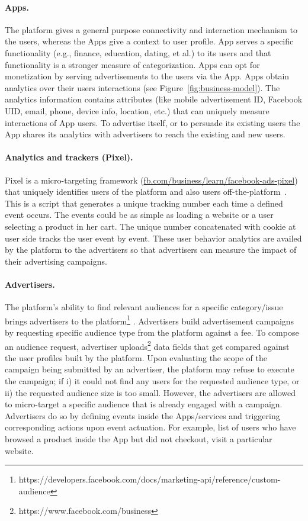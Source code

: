 \documentclass[runningheads]{llncs}
\begin{document}
\paragraph{Apps.}
The platform gives a general purpose connectivity and interaction
mechanism to the users, whereas the Apps give a context to user
profile. App serves a specific functionality (e.g., finance,
education, dating, et al.) to its users and that functionality is a
stronger measure of categorization. Apps can opt for monetization by
serving advertisements to the users via the App. Apps obtain analytics
over their users interactions (see
Figure~\ref{fig:business-model}). The analytics information contains
attributes (like mobile advertisement ID, Facebook UID, email, phone,
device info, location, etc.) that can uniquely measure interactions of
App users. To advertise itself, or to persuade its existing users the
App shares its analytics with advertisers to reach the existing and
new users.

\paragraph{Analytics and trackers (Pixel).}
Pixel is a micro-targeting framework
(\url{fb.com/business/learn/facebook-ads-pixel}) that uniquely
identifies users of the platform and also users
off-the-platform~\cite{social-plugins,web-never-forgets}. This is a
script that generates a unique tracking number each time a defined
event occurs. The events could be as simple as loading a website or a
user selecting a product in her cart. The unique number concatenated
with cookie at user side tracks the user event by event. These user
behavior analytics are availed by the platform to the advertisers so
that advertisers can measure the impact of their advertising
campaigns.

\paragraph{Advertisers.}
The platform's ability to find relevant audiences for a specific
category/issue brings advertisers to the
platform\footnote{https://developers.facebook.com/docs/marketing-api/reference/custom-audience}
. Advertisers build advertisement campaigns by requesting specific
audience type from the platform against a fee. To compose an audience
request, advertiser
uploads\footnote{https://www.facebook.com/business} data fields that
get compared against the user profiles built by the platform. Upon
evaluating the scope of the campaign being submitted by an advertiser,
the platform may refuse to execute the campaign; if i) it could not
find any users for the requested audience type, or ii) the requested
audience size is too small. However, the advertisers are allowed to
micro-target a specific audience that is already engaged with a
campaign. Advertisers do so by defining events inside the
Apps/services and triggering corresponding actions upon event
actuation. For example, list of users who have browsed a product
inside the App but did not checkout, visit a particular website.
\end{document}
